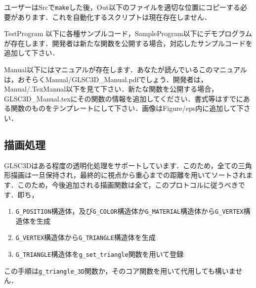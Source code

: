 \documentclass[platex,a4paper,12pt]{jsarticle}%
\begin{document}
ユーザーはSrcで\verb|make|した後，Out以下のファイルを適切な位置にコピーする必要があります．これを自動化するスクリプトは現在存在しません．

TestProgram 以下に各種サンプルコード，SampleProgram以下にデモプログラムが存在します．開発者は新たな関数を公開する場合，対応したサンプルコードを追加して下さい．

Manual以下にはマニュアルが存在します．あなたが読んでいるこのマニュアルは，おそらくManual/GLSC3D\_Manual.pdfでしょう．開発者は，Manual/.TexManual以下を見て下さい．新たな関数を公開する場合，GLSC3D\_Manual.texにその関数の情報を追加してください．書式等はすでにある関数のものをテンプレートにして下さい．画像はFigure/eps内に追加して下さい．


\subsection{描画処理}
GLSC3Dはある程度の透明化処理をサポートしています．このため，全ての三角形描画は一旦保持され，最終的に視点から重心までの距離を用いてソートされます．このため，今後追加される描画関数は全て，このプロトコルに従うべきです．即ち，

\begin{enumerate}
 \item \verb|G_POSITION|構造体，及び\verb|G_COLOR|構造体か\verb|G_MATERIAL|構造体から\verb|G_VERTEX|構造体を生成
 \item \verb|G_VERTEX|構造体から\verb|G_TRIANGLE|構造体を生成
 \item \verb|G_TRIANGLE|構造体を\verb|g_set_triangle|関数を用いて登録
\end{enumerate}

この手順は\verb|g_triangle_3D|関数か，そのコア関数を用いて代用しても構いません．
\end{document}
